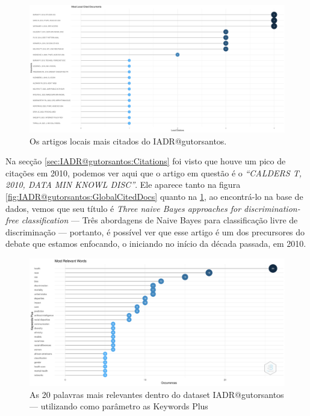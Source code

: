 \begin{figure}[H]
    \centering
\includegraphics[angle=0,width=1\textwidth]{experiments/gutorsantos/AnaliseBibliometrica/IAeDiscriminacao/imgs/MostLocalCitedDocuments-2022-02-09.png}
    \caption{Os artigos locais mais citados do IADR@gutorsantos.}
    \label{fig:IADR@gutorsantos:LocalCitedDocs}
\end{figure}

Na secção \ref{sec:IADR@gutorsantos:Citations} foi visto que houve um pico de citações em 2010, podemos ver aqui que o artigo em questão é o \textit{``CALDERS T, 2010, DATA MIN KNOWL DISC''}. Ele aparece tanto na figura \ref{fig:IADR@gutorsantos:GlobalCitedDocs} quanto na \ref{fig:IADR@gutorsantos:LocalCitedDocs}, ao encontrá-lo na base de dados, vemos que seu título é \textit{Three naive Bayes approaches for discrimination-free classification} --- Três abordagens de Naive Bayes para classificação livre de discriminação --- portanto, é possível ver que esse artigo é um dos precursores do debate que estamos enfocando, o iniciando no início da década passada, em 2010.

\begin{figure}[H]
    \centering
    \includegraphics[angle=0,width=1\textwidth]{experiments/gutorsantos/AnaliseBibliometrica/IAeDiscriminacao/imgs/MostRelevantWords-2022-02-09.png}
    \caption{As 20 palavras mais relevantes dentro do dataset IADR@gutorsantos --- utilizando como parâmetro as Keywords Plus}
    \label{fig:IADR@gutorsantos:RelevantWords}
\end{figure}

